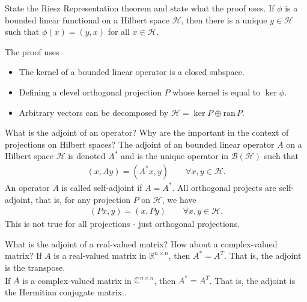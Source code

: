 \documentclass[avery5388,grid,frame]{flashcards}
\newcommand{\ran}{\mathrm{ran}\,}
\def\Rl{\mathbb{R}}
\def\Cx{\mathbb{C}}
\def\hilb{\mathcal{H}}
\begin{document}
\begin{flashcard}
    {State the Riesz Representation theorem and state what the proof uses.}
    If $\phi$ is a bounded linear functional on a Hilbert space $\hilb$, then there is a unique $y\in\hilb$ such that $\phi(x) = (y,x)$ for all $x \in \hilb$.

    The proof uses
    \begin{itemize}
        \item The kernel of a bounded linear operator is a closed subspace.
        \item Defining a clevel orthogonal projection $P$ whose kernel is equal to $\ker \phi$.
        \item Arbitrary vectors can be decomposed by $\hilb = \ker P \oplus \ran P$.
    \end{itemize}
\end{flashcard}

\begin{flashcard}
    {What is the adjoint of an operator?  Why are the important in the context of projections on Hilbert spaces?}
    The adjoint of an bounded linear operator $A$ on a Hilbert space $\hilb$ is denoted $A^*$ and is the unique operator in $\mathcal{B}(\hilb)$ such that
    \begin{align*}
        (x, Ay) = (A^*x, y) \qquad \forall x, y \in \hilb.
    \end{align*}
    An operator $A$ is called self-adjoint if $A = A^*$.  All orthogonal projects are self-adjoint, that is, for any projection $P$ on $\hilb$, we have
    \begin{align*}
        (Px, y) = (x, Py) \qquad \forall x,y\in\hilb.
    \end{align*}
    This is not true for all projections - just orthogonal projections.
\end{flashcard}

\begin{flashcard}
    {What is the adjoint of a real-valued matrix?  How about a complex-valued matrix?}
    If $A$ is a real-valued matrix in $\Rl^{n\times n}$, then $A^* = A^T$.  That is, the adjoint is the transpose. \\

    If $A$ is a complex-valued matrix in $\Cx^{n\times n}$, then $A^* = \overline{A^T}$.  That is, the adjoint is the Hermitian conjugate matrix..
\end{flashcard}
\end{document}
